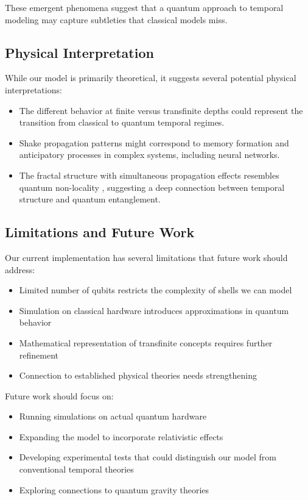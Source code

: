 \documentclass[12pt,a4paper]{article}
\begin{document}
These emergent phenomena suggest that a quantum approach to temporal modeling may capture subtleties that classical models miss.

\subsection{Physical Interpretation}

While our model is primarily theoretical, it suggests several potential physical interpretations:

\begin{itemize}
    \item The different behavior at finite versus transfinite depths could represent the transition from classical to quantum temporal regimes.
    
    \item Shake propagation patterns might correspond to memory formation and anticipatory processes in complex systems, including neural networks.
    
    \item The fractal structure with simultaneous propagation effects resembles quantum non-locality \citep{aharonov, cramer}, suggesting a deep connection between temporal structure and quantum entanglement.
\end{itemize}

\subsection{Limitations and Future Work}

Our current implementation has several limitations that future work should address:

\begin{itemize}
    \item Limited number of qubits restricts the complexity of shells we can model
    \item Simulation on classical hardware introduces approximations in quantum behavior
    \item Mathematical representation of transfinite concepts requires further refinement
    \item Connection to established physical theories needs strengthening
\end{itemize}

Future work should focus on:

\begin{itemize}
    \item Running simulations on actual quantum hardware
    \item Expanding the model to incorporate relativistic effects
    \item Developing experimental tests that could distinguish our model from conventional temporal theories
    \item Exploring connections to quantum gravity theories
\end{itemize}
\end{document}
